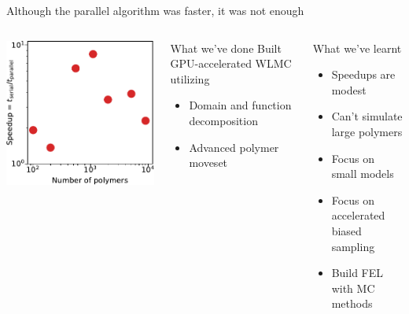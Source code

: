 \documentclass[aspectratio=169]{beamer}
\begin{document}
\begin{frame}[t]{Although the parallel algorithm was faster, it was not enough}

  \begin{columns}[T]

    \centering
    \vspace{.5\baselineskip}
    \includegraphics[]{../figures/ch3_gpu/fig-speedup_new/fig-speedup.pdf}


    \centering
    \begin{block}{What we've done}
      Built GPU-accelerated WLMC utilizing
      \begin{itemize}
      \item Domain and function decomposition
      \item Advanced polymer moveset
    \end{itemize}
    \end{block}

    \begin{block}{What we've learnt}
      \begin{itemize}
        \item Speedups are modest
        \item Can't simulate large polymers
        \item Focus on small models
        \item Focus on accelerated biased sampling
        \item Build FEL with MC methods
      \end{itemize}
    \end{block}

  \end{columns}

\end{frame}
\end{document}
